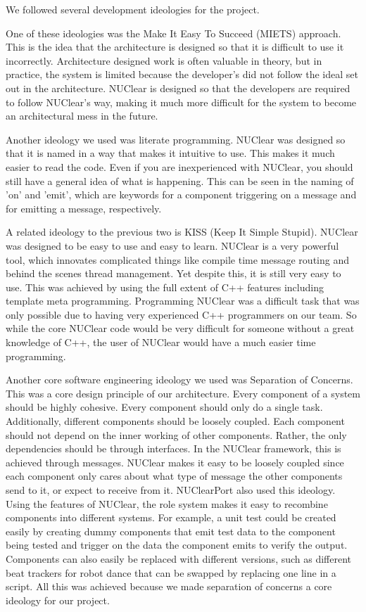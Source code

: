 \documentclass[english,12pt]{scrartcl}
\begin{document}
		We followed several development ideologies for the project.

		One of these ideologies was the Make It Easy To Succeed (MIETS) approach.
		This is the idea that the architecture is designed so that it is difficult to use it incorrectly.
		Architecture designed work is often valuable in theory, but in practice, the system is limited because the developer’s did not follow the ideal set out in the architecture.
		NUClear is designed so that the developers are required to follow NUClear’s way, making it much more difficult for the system to become an architectural mess in the future.

		Another ideology we used was literate programming.
		NUClear was designed so that it is named in a way that makes it intuitive to use.
		This makes it much easier to read the code.
		Even if you are inexperienced with NUClear, you should still have a general idea of what is happening.
		This can be seen in the naming of ’on’ and ’emit’, which are keywords for a component triggering on a message and for emitting a message, respectively.

		A related ideology to the previous two is KISS (Keep It Simple Stupid).
		NUClear was designed to be easy to use and easy to learn.
		NUClear is a very powerful tool, which innovates complicated things like compile time message routing and behind the scenes thread management.
		Yet despite this, it is still very easy to use.
		This was achieved by using the full extent of C++ features including template meta programming.
		Programming NUClear was a difficult task that was only possible due to having very experienced C++ programmers on our team.
		So while the core NUClear code would be very difficult for someone without a great knowledge of C++, the user of NUClear would have a much easier time programming.

		Another core software engineering ideology we used was Separation of Concerns.
		This was a core design principle of our architecture.
		Every component of a system should be highly cohesive.
		Every component should only do a single task.
		Additionally, different components should be loosely coupled.
		Each component should not depend on the inner working of other components.
		Rather, the only dependencies should be through interfaces.
		In the NUClear framework, this is achieved through messages.
		NUClear makes it easy to be loosely coupled since each component only cares about what type of message the other components send to it, or expect to receive from it.
		NUClearPort also used this ideology. Using the features of NUClear, the role system makes it easy to recombine components into different systems.
		For example, a unit test could be created easily by creating dummy components that emit test data to the component being tested and trigger on the data the component emits to verify the output.
		Components can also easily be replaced with different versions, such as different beat trackers for robot dance that can be swapped by replacing one line in a script. All this was achieved because we made separation of concerns a core ideology for our project.
\end{document}
